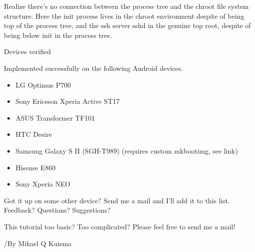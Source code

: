 Realize there's no connection between the process tree and the chroot file
system structure. Here the init process lives in the chroot environment despite
of being top of the process tree, and the ssh server sshd in the genuine top
root, despite of being below init in the process tree.

Devices verified

Implemented successfully on the following Android devices.

\begin{itemize}
  \item 
LG Optimus P700
  \item 
Sony Ericsson Xperia Active ST17
  \item 
ASUS Transformer TF101
  \item 
HTC Desire
  \item 
Samsung Galaxy S II (SGH-T989) (requires custom mkbootimg, see link)
  \item 
Hisense E860
  \item 
Sony Xperia NEO
\end{itemize}

Got it up on some other device? Send me a mail and I'll add it to this list.
Feedback? Questions? Suggestions?

This tutorial too basic? Too complicated? Please feel free to send me a mail!

/By Mikael Q Kuisma
